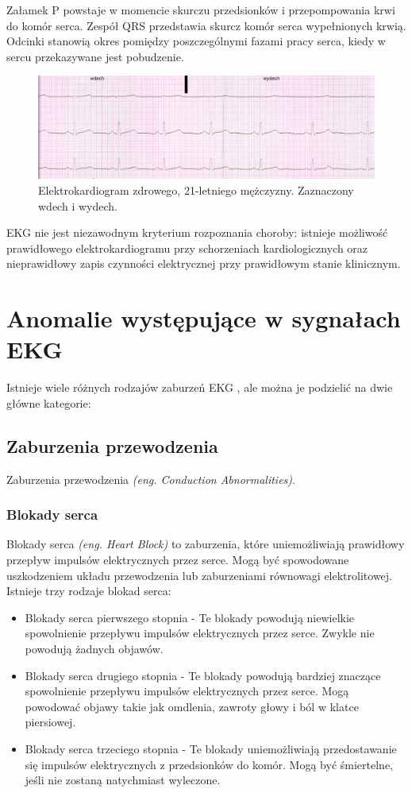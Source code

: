 \documentclass[12pt,a4paper]{article}
\begin{document}
Załamek P powstaje w momencie skurczu przedsionków i przepompowania krwi do komór serca.
Zespół QRS przedstawia skurcz komór serca wypełnionych krwią.
Odcinki stanowią okres pomiędzy poszczególnymi fazami pracy serca, kiedy w sercu przekazywane jest pobudzenie.

\begin{figure}[H]
    \centering
    \includegraphics[width=1\linewidth]{EKG_wykres.jpg}
    \caption{Elektrokardiogram zdrowego, 21-letniego mężczyzny. Zaznaczony wdech i wydech. \cite{elektrokardiogram-wykres}}
\end{figure}

EKG nie jest niezawodnym kryterium rozpoznania choroby: istnieje możliwość prawidłowego elektrokardiogramu przy schorzeniach kardiologicznych oraz nieprawidłowy zapis czynności elektrycznej przy prawidłowym stanie klinicznym. 

\newpage{}

\section{Anomalie występujące w sygnałach EKG}
Istnieje wiele różnych rodzajów zaburzeń EKG \cite{ecg-abnormalities}, ale można je podzielić na dwie główne kategorie:

\subsection{Zaburzenia przewodzenia}
Zaburzenia przewodzenia \textit{(eng. Conduction Abnormalities)}.

\subsubsection{Blokady serca}
Blokady serca \textit{(eng. Heart Block)} to zaburzenia, które uniemożliwiają prawidłowy przepływ impulsów elektrycznych przez serce. Mogą być spowodowane uszkodzeniem układu przewodzenia lub zaburzeniami równowagi elektrolitowej. Istnieje trzy rodzaje blokad serca:
\begin{itemize}
    \item Blokady serca pierwszego stopnia - Te blokady powodują niewielkie spowolnienie przepływu impulsów elektrycznych przez serce. Zwykle nie powodują żadnych objawów.
    \item Blokady serca drugiego stopnia - Te blokady powodują bardziej znaczące spowolnienie przepływu impulsów elektrycznych przez serce. Mogą powodować objawy takie jak omdlenia, zawroty głowy i ból w klatce piersiowej.
    \item Blokady serca trzeciego stopnia - Te blokady uniemożliwiają przedostawanie się impulsów elektrycznych z przedsionków do komór. Mogą być śmiertelne, jeśli nie zostaną natychmiast wyleczone.
\end{itemize}
\end{document}
